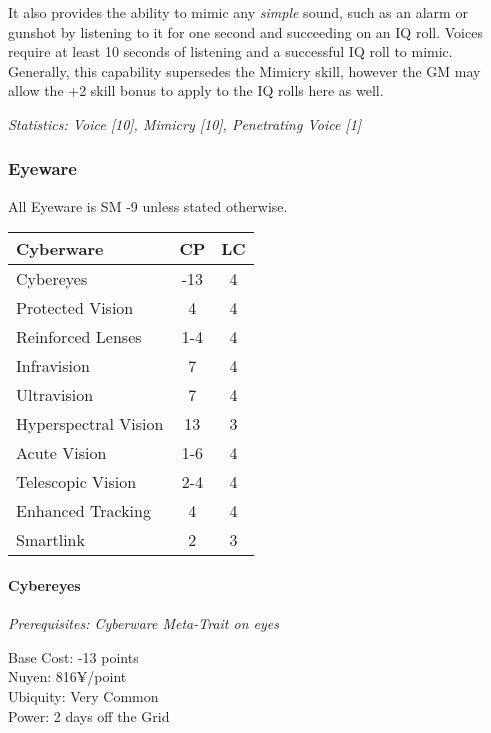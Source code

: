 \begin{multicols*}{3}
	It also provides the ability to mimic any \textit{simple} sound, such as an alarm or gunshot by listening to it for one second and succeeding on an IQ roll. Voices require at least 10 seconds of listening and a successful IQ roll to mimic. Generally, this capability supersedes the Mimicry skill, however the GM may allow the +2 skill bonus to apply to the IQ rolls here as well. 

	\textit{\textcolor{OliveGreen}{Statistics: Voice [10], Mimicry [10], Penetrating Voice [1] }}
	
	\subsubsection{Eyeware}
	
	All Eyeware is SM -9 unless stated otherwise.
	
	\begin{center}
		\begin{tabularx}{0.32\textwidth}{|X|c|c|}
			\hline
			Cyberware & CP & LC\\
			\hline
			\hline
			Cybereyes & -13 & 4 \\
			\hline
			Protected Vision & 4 & 4 \\
			Reinforced Lenses & 1-4 & 4 \\
			Infravision & 7 & 4 \\
			Ultravision & 7 & 4 \\
			Hyperspectral Vision & 13 & 3 \\
			Acute Vision & 1-6 & 4 \\
			Telescopic Vision & 2-4 & 4 \\
			Enhanced Tracking & 4 & 4 \\
			Smartlink & 2 & 3 \\
			\hline
		\end{tabularx}
	\end{center}
	
	\paragraph{Cybereyes}
	\textit{Prerequisites: Cyberware Meta-Trait on eyes}
	\begin{flushright}
		Base Cost: -13 points\\
		Nuyen: 816¥/point\\
		Ubiquity: Very Common\\
		Power: 2 days off the Grid\\
	\end{flushright}
	

\end{multicols*}
